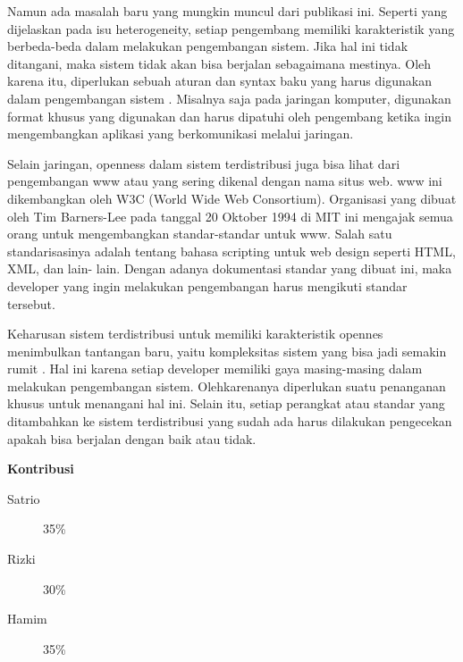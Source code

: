 \documentclass[12pt,a4paper]{apa}
\begin{document}
	Namun ada masalah baru yang mungkin muncul dari publikasi ini. Seperti yang dijelaskan pada isu heterogeneity, setiap pengembang memiliki karakteristik yang berbeda-beda dalam melakukan pengembangan sistem. Jika hal ini tidak ditangani, maka sistem tidak akan bisa berjalan sebagaimana mestinya. Oleh karena itu, diperlukan sebuah aturan dan syntax baku yang harus digunakan dalam pengembangan sistem \cite{Tanenbaum2007}. Misalnya saja pada jaringan komputer, digunakan format khusus yang digunakan dan harus dipatuhi oleh pengembang ketika ingin mengembangkan aplikasi yang berkomunikasi melalui jaringan. 
	
	Selain jaringan, openness dalam sistem terdistribusi juga bisa lihat dari pengembangan www atau yang sering dikenal dengan nama situs web. www ini dikembangkan oleh W3C (World Wide Web Consortium). Organisasi yang dibuat oleh Tim Barners-Lee pada tanggal 20 Oktober 1994 di MIT ini mengajak semua orang untuk mengembangkan standar-standar untuk www. Salah satu standarisasinya adalah tentang bahasa scripting untuk web design seperti HTML, XML, dan lain- lain. Dengan adanya dokumentasi standar yang dibuat ini, maka developer yang ingin melakukan pengembangan harus mengikuti standar tersebut. 
	
	Keharusan sistem terdistribusi untuk memiliki karakteristik opennes menimbulkan tantangan baru, yaitu kompleksitas sistem yang bisa jadi semakin rumit \cite{Coulouris2012}. Hal ini karena setiap developer memiliki gaya masing-masing dalam melakukan pengembangan sistem. Olehkarenanya diperlukan suatu penanganan khusus untuk menangani hal ini. Selain itu, setiap perangkat atau standar yang ditambahkan ke sistem terdistribusi yang sudah ada harus dilakukan pengecekan apakah bisa berjalan dengan baik atau tidak. \cite{Coulouris2012}
	
	
	
	\newpage
	
	\begin{center}
		\textbf{Kontribusi}
	\end{center}
	\begin{description}
		\item[Satrio] 35\%
		\item[Rizki] 30\%
		\item[Hamim] 35\%
	\end{description}
\end{document}
